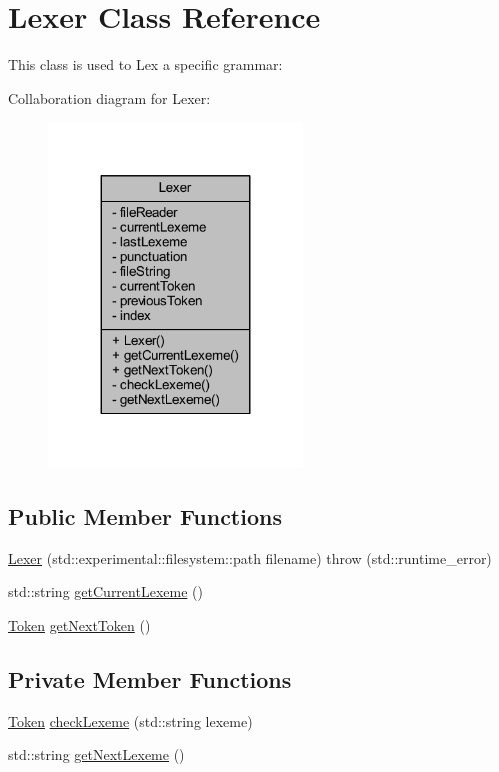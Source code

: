 \hypertarget{class_lexer}{}\section{Lexer Class Reference}
\label{class_lexer}


This class is used to Lex a specific grammar\+:  




Collaboration diagram for Lexer\+:
\nopagebreak
\begin{figure}[H]
\begin{center}
\leavevmode
\includegraphics[width=191pt]{dd/d77/class_lexer__coll__graph}
\end{center}
\end{figure}
\subsection*{Public Member Functions}
\begin{DoxyCompactItemize}
\item 
\hyperlink{class_lexer_a41a25e738dff5c31caf442990709adde}{Lexer} (std\+::experimental\+::filesystem\+::path filename)  throw (std\+::runtime\+\_\+error)
\item 
std\+::string \hyperlink{class_lexer_a7fac880306793388754a6f9da34c3493}{get\+Current\+Lexeme} ()
\item 
\hyperlink{_lexer_8h_a6a9e93b081bad7fc74c17306fb168c1f}{Token} \hyperlink{class_lexer_aa8d555ee90674216793bb43c05bba64f}{get\+Next\+Token} ()
\end{DoxyCompactItemize}
\subsection*{Private Member Functions}
\begin{DoxyCompactItemize}
\item 
\hyperlink{_lexer_8h_a6a9e93b081bad7fc74c17306fb168c1f}{Token} \hyperlink{class_lexer_a50bcd81726a049971e16c4a6e8223604}{check\+Lexeme} (std\+::string lexeme)
\item 
std\+::string \hyperlink{class_lexer_a97988fed0390931fa45fe8a8fee39e2f}{get\+Next\+Lexeme} ()
\end{DoxyCompactItemize}
